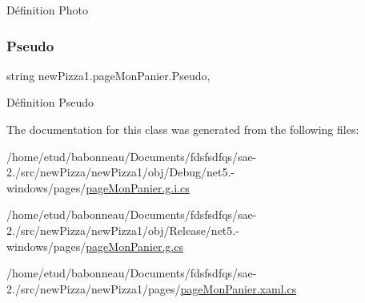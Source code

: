 Définition Photo 

\mbox{\label{classnewPizza1_1_1pageMonPanier_a3b25bd9224ceb331caa78dbe820b6869}} 
\subsubsection{\texorpdfstring{Pseudo}{Pseudo}}
{\footnotesize\ttfamily string new\+Pizza1.\+page\+Mon\+Panier.\+Pseudo\hspace{0.3cm}{\ttfamily [get]}, {\ttfamily [set]}}



Définition Pseudo 



The documentation for this class was generated from the following files\+:\begin{DoxyCompactItemize}
\item 
/home/etud/babonneau/\+Documents/fdsfsdfqs/sae-\/2./src/new\+Pizza/new\+Pizza1/obj/\+Debug/net5.-\/windows/pages/\hyperlink{net5_80-windows_2pages_2pageMonPanier_8g_8i_8cs}{page\+Mon\+Panier.\+g.\+i.\+cs}\item 
/home/etud/babonneau/\+Documents/fdsfsdfqs/sae-\/2./src/new\+Pizza/new\+Pizza1/obj/\+Release/net5.-\/windows/pages/\hyperlink{pageMonPanier_8g_8cs}{page\+Mon\+Panier.\+g.\+cs}\item 
/home/etud/babonneau/\+Documents/fdsfsdfqs/sae-\/2./src/new\+Pizza/new\+Pizza1/pages/\hyperlink{pageMonPanier_8xaml_8cs}{page\+Mon\+Panier.\+xaml.\+cs}\end{DoxyCompactItemize}
